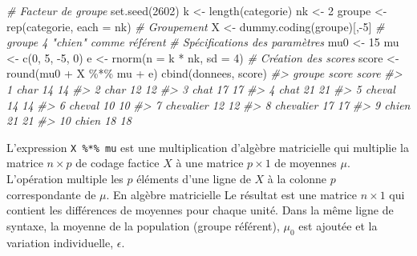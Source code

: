 \documentclass[
]{book}
\newenvironment{Shaded}{}{}
\newcommand{\AttributeTok}[1]{#1}
\newcommand{\CommentTok}[1]{\textit{#1}}
\newcommand{\DecValTok}[1]{#1}
\newcommand{\FunctionTok}[1]{#1}
\newcommand{\NormalTok}[1]{#1}
\newcommand{\OtherTok}[1]{#1}
\newcommand{\SpecialCharTok}[1]{#1}
\begin{document}
\begin{Shaded}
\begin{Highlighting}[]
\CommentTok{\# Facteur de groupe}
\FunctionTok{set.seed}\NormalTok{(}\DecValTok{2602}\NormalTok{)}
\NormalTok{k }\OtherTok{\textless{}{-}} \FunctionTok{length}\NormalTok{(categorie)}
\NormalTok{nk }\OtherTok{\textless{}{-}} \DecValTok{2}
\NormalTok{groupe }\OtherTok{\textless{}{-}} \FunctionTok{rep}\NormalTok{(categorie, }\AttributeTok{each =}\NormalTok{ nk)}
\CommentTok{\# Groupement}
\NormalTok{X }\OtherTok{\textless{}{-}} \FunctionTok{dummy.coding}\NormalTok{(groupe)[,}\SpecialCharTok{{-}}\DecValTok{5}\NormalTok{] }\CommentTok{\# groupe 4 "chien" comme référent}
\CommentTok{\# Spécifications des paramètres}
\NormalTok{mu0 }\OtherTok{\textless{}{-}} \DecValTok{15}
\NormalTok{mu }\OtherTok{\textless{}{-}} \FunctionTok{c}\NormalTok{(}\DecValTok{0}\NormalTok{, }\DecValTok{5}\NormalTok{, }\SpecialCharTok{{-}}\DecValTok{5}\NormalTok{, }\DecValTok{0}\NormalTok{)}
\NormalTok{e }\OtherTok{\textless{}{-}} \FunctionTok{rnorm}\NormalTok{(}\AttributeTok{n =}\NormalTok{ k }\SpecialCharTok{*}\NormalTok{ nk, }\AttributeTok{sd =} \DecValTok{4}\NormalTok{)}
\CommentTok{\# Création des scores}
\NormalTok{score }\OtherTok{\textless{}{-}} \FunctionTok{round}\NormalTok{(mu0 }\SpecialCharTok{+}\NormalTok{ X }\SpecialCharTok{\%*\%}\NormalTok{ mu }\SpecialCharTok{+}\NormalTok{ e)}
\FunctionTok{cbind}\NormalTok{(donnees, score)}
\CommentTok{\#\textgreater{}       groupe score score}
\CommentTok{\#\textgreater{} 1       char    14    14}
\CommentTok{\#\textgreater{} 2       char    12    12}
\CommentTok{\#\textgreater{} 3       chat    17    17}
\CommentTok{\#\textgreater{} 4       chat    21    21}
\CommentTok{\#\textgreater{} 5     cheval    14    14}
\CommentTok{\#\textgreater{} 6     cheval    10    10}
\CommentTok{\#\textgreater{} 7  chevalier    12    12}
\CommentTok{\#\textgreater{} 8  chevalier    17    17}
\CommentTok{\#\textgreater{} 9      chien    21    21}
\CommentTok{\#\textgreater{} 10     chien    18    18}
\end{Highlighting}
\end{Shaded}

L'expression \texttt{X\ \%*\%\ mu} est une multiplication d'algèbre matricielle qui multiplie la matrice \(n \times p\) de codage factice \(X\) à une matrice \(p\times 1\) de moyennes \(\mu\). L'opération multiple les \(p\) éléments d'une ligne de \(X\) à la colonne \(p\) correspondante de \(\mu\). En algèbre matricielle Le résultat est une matrice \(n \times 1\) qui contient les différences de moyennes pour chaque unité. Dans la même ligne de syntaxe, la moyenne de la population (groupe référent), \(\mu_0\) est ajoutée et la variation individuelle, \(\epsilon\).
\end{document}
